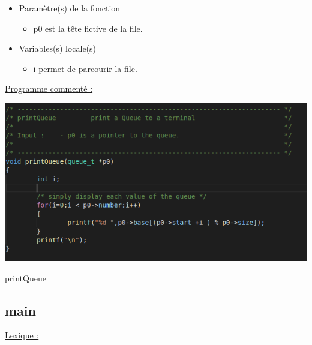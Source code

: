 \documentclass[a4paper]{article}
\begin{document}
\begin{itemize}

\item Paramètre(s) de la fonction  

\begin{itemize}

\item p0 est la tête fictive de la file.

\end{itemize}
\item Variables(s) locale(s)  

\begin{itemize}

\item i permet de parcourir la file.

\end{itemize}
\end{itemize}
\underline{Programme commenté :}
\begin{center}
\includegraphics[scale=0.4]{printQueue.png}

printQueue
\end{center}
\subsection{main}
\underline{Lexique :}
\end{document}
